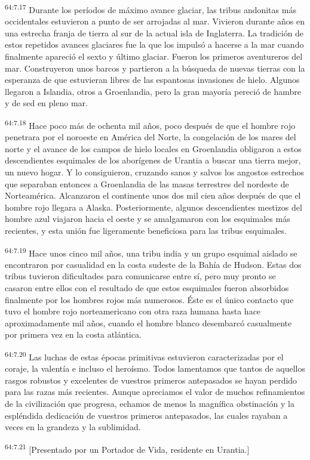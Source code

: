 \par
\textsuperscript{64:7.17} Durante los períodos de máximo avance glaciar, las tribus andonitas más occidentales estuvieron a punto de ser arrojadas al mar. Vivieron durante años en una estrecha franja de tierra al sur de la actual isla de Inglaterra. La tradición de estos repetidos avances glaciares fue la que los impulsó a hacerse a la mar cuando finalmente apareció el sexto y último glaciar. Fueron los primeros aventureros del mar. Construyeron unos barcos y partieron a la búsqueda de nuevas tierras con la esperanza de que estuvieran libres de las espantosas invasiones de hielo. Algunos llegaron a Islandia, otros a Groenlandia, pero la gran mayoría pereció de hambre y de sed en pleno mar.

\par
\textsuperscript{64:7.18} Hace poco más de ochenta mil años, poco después de que el hombre rojo penetrara por el noroeste en América del Norte, la congelación de los mares del norte y el avance de los campos de hielo locales en Groenlandia obligaron a estos descendientes esquimales de los aborígenes de Urantia a buscar una tierra mejor, un nuevo hogar. Y lo consiguieron, cruzando sanos y salvos los angostos estrechos que separaban entonces a Groenlandia de las masas terrestres del nordeste de Norteamérica. Alcanzaron el continente unos dos mil cien años después de que el hombre rojo llegara a Alaska. Posteriormente, algunos descendientes mestizos del hombre azul viajaron hacia el oeste y se amalgamaron con los esquimales más recientes, y esta unión fue ligeramente beneficiosa para las tribus esquimales.

\par
\textsuperscript{64:7.19} Hace unos cinco mil años, una tribu india y un grupo esquimal aislado se encontraron por casualidad en la costa sudeste de la Bahía de Hudson. Estas dos tribus tuvieron dificultades para comunicarse entre sí, pero muy pronto se casaron entre ellos con el resultado de que estos esquimales fueron absorbidos finalmente por los hombres rojos más numerosos. Éste es el único contacto que tuvo el hombre rojo norteamericano con otra raza humana hasta hace aproximadamente mil años, cuando el hombre blanco desembarcó casualmente por primera vez en la costa atlántica.

\par
\textsuperscript{64:7.20} Las luchas de estas épocas primitivas estuvieron caracterizadas por el coraje, la valentía e incluso el heroísmo. Todos lamentamos que tantos de aquellos rasgos robustos y excelentes de vuestros primeros antepasados se hayan perdido para las razas más recientes. Aunque apreciamos el valor de muchos refinamientos de la civilización que progresa, echamos de menos la magnífica obstinación y la espléndida dedicación de vuestros primeros antepasados, las cuales rayaban a veces en la grandeza y la sublimidad.

\par
\textsuperscript{64:7.21} [Presentado por un Portador de Vida, residente en Urantia.]
